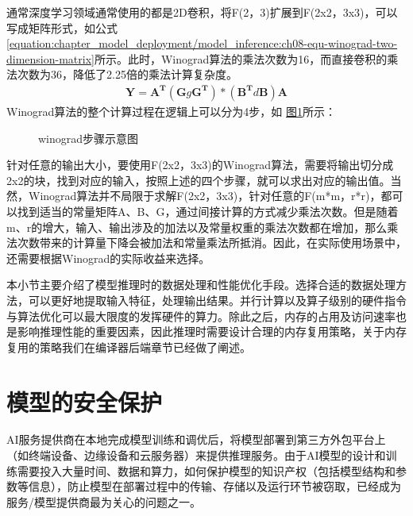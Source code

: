 \documentclass[letterpaper,10pt,english]{sphinxmanual}
\let\sphinxpxdimen\pdfpxdimen\else\newdimen\sphinxpxdimen
\begin{document}
\sphinxAtStartPar
通常深度学习领域通常使用的都是2D卷积，将F(2，3)扩展到F(2x2，3x3)，可以写成矩阵形式，如公式
\eqref{equation:chapter_model_deployment/model_inference:ch08-equ-winograd-two-dimension-matrix}所示。此时，Winograd算法的乘法次数为16，而直接卷积的乘法次数为36，降低了2.25倍的乘法计算复杂度。
\begin{equation}\label{equation:chapter_model_deployment/model_inference:ch08-equ-winograd-two-dimension-matrix}
\begin{split}\mathbf{Y}=\mathbf{A^T}(\mathbf{G}g\mathbf{G^T})*(\mathbf{B^T}d\mathbf{B})\mathbf{A}\end{split}
\end{equation}
\sphinxAtStartPar
Winograd算法的整个计算过程在逻辑上可以分为4步，如
\hyperref[\detokenize{chapter_model_deployment/model_inference:ch08-fig-winograd}]{图\ref{\detokenize{chapter_model_deployment/model_inference:ch08-fig-winograd}}}所示：

\begin{figure}[H]
\centering
\capstart

\noindent\sphinxincludegraphics[width=500\sphinxpxdimen]{{winograd}.png}
\caption{winograd步骤示意图}\label{\detokenize{chapter_model_deployment/model_inference:id15}}\label{\detokenize{chapter_model_deployment/model_inference:ch08-fig-winograd}}\end{figure}

\sphinxAtStartPar
针对任意的输出大小，要使用F(2x2，3x3)的Winograd算法，需要将输出切分成2x2的块，找到对应的输入，按照上述的四个步骤，就可以求出对应的输出值。当然，Winograd算法并不局限于求解F(2x2，3x3)，针对任意的F(m*m，r*r)，都可以找到适当的常量矩阵A、B、G，通过间接计算的方式减少乘法次数。但是随着m、r的增大，输入、输出涉及的加法以及常量权重的乘法次数都在增加，那么乘法次数带来的计算量下降会被加法和常量乘法所抵消。因此，在实际使用场景中，还需要根据Winograd的实际收益来选择。

\sphinxAtStartPar
本小节主要介绍了模型推理时的数据处理和性能优化手段。选择合适的数据处理方法，可以更好地提取输入特征，处理输出结果。并行计算以及算子级别的硬件指令与算法优化可以最大限度的发挥硬件的算力。除此之后，内存的占用及访问速率也是影响推理性能的重要因素，因此推理时需要设计合理的内存复用策略，关于内存复用的策略我们在编译器后端章节已经做了阐述。


\section{模型的安全保护}
\label{\detokenize{chapter_model_deployment/model_security:id1}}\label{\detokenize{chapter_model_deployment/model_security::doc}}
\sphinxAtStartPar
AI服务提供商在本地完成模型训练和调优后，将模型部署到第三方外包平台上（如终端设备、边缘设备和云服务器）来提供推理服务。由于AI模型的设计和训练需要投入大量时间、数据和算力，如何保护模型的知识产权（包括模型结构和参数等信息），防止模型在部署过程中的传输、存储以及运行环节被窃取，已经成为服务/模型提供商最为关心的问题之一。
\end{document}
